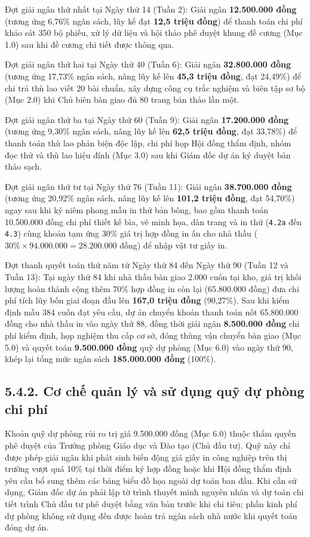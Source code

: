 Đợt giải ngân thứ nhất tại Ngày thứ 14 (Tuần 2): Giải ngân \textbf{12.500.000 đồng} (tương ứng 6,76\% ngân sách, lũy kế đạt \textbf{12,5 triệu đồng}) để thanh toán chi phí khảo sát 350 bộ phiếu, xử lý dữ liệu và hội thảo phê duyệt khung đề cương (Mục 1.0) sau khi đề cương chi tiết được thông qua.

Đợt giải ngân thứ hai tại Ngày thứ 40 (Tuần 6): Giải ngân \textbf{32.800.000 đồng} (tương ứng 17,73\% ngân sách, nâng lũy kế lên \textbf{45,3 triệu đồng}, đạt 24,49\%) để chi trả thù lao viết 20 bài chuẩn, xây dựng công cụ trắc nghiệm và biên tập sơ bộ (Mục 2.0) khi Chủ biên bàn giao đủ 80 trang bản thảo lần một.

Đợt giải ngân thứ ba tại Ngày thứ 60 (Tuần 9): Giải ngân \textbf{17.200.000 đồng} (tương ứng 9,30\% ngân sách, nâng lũy kế lên \textbf{62,5 triệu đồng}, đạt 33,78\%) để thanh toán thù lao phản biện độc lập, chi phí họp Hội đồng thẩm định, nhóm đọc thử và thù lao hiệu đính (Mục 3.0) sau khi Giám đốc dự án ký duyệt bản thảo sạch.

Đợt giải ngân thứ tư tại Ngày thứ 76 (Tuần 11): Giải ngân \textbf{38.700.000 đồng} (tương ứng 20,92\% ngân sách, nâng lũy kế lên \textbf{101,2 triệu đồng}, đạt 54,70\%) ngay sau khi ký niêm phong mẫu in thử bản bông, bao gồm thanh toán 10.500.000 đồng chi phí thiết kế bìa, vẽ minh họa, dàn trang và in thử (\texttt{4.2a} đến \texttt{4.3}) cùng khoản tạm ứng 30\% giá trị hợp đồng in ấn cho nhà thầu ($30\% \times 94.000.000 = 28.200.000$ đồng) để nhập vật tư giấy in.

Đợt thanh quyết toán thứ năm từ Ngày thứ 84 đến Ngày thứ 90 (Tuần 12 và Tuần 13): Tại ngày thứ 84 khi nhà thầu bàn giao 2.000 cuốn tại kho, giá trị khối lượng hoàn thành cộng thêm 70\% hợp đồng in còn lại (65.800.000 đồng) đưa chi phí tích lũy bốn giai đoạn đầu lên \textbf{167,0 triệu đồng} (90,27\%). Sau khi kiểm định mẫu 384 cuốn đạt yêu cầu, dự án chuyển khoản thanh toán nốt 65.800.000 đồng cho nhà thầu in vào ngày thứ 88, đồng thời giải ngân \textbf{8.500.000 đồng} chi phí kiểm định, họp nghiệm thu cấp cơ sở, đóng thùng vận chuyển bàn giao (Mục 5.0) và quyết toán \textbf{9.500.000 đồng} quỹ dự phòng (Mục 6.0) vào ngày thứ 90, khép lại tổng mức ngân sách \textbf{185.000.000 đồng} (100\%).

\subsection{5.4.2. Cơ chế quản lý và sử dụng quỹ dự phòng chi phí}

Khoản quỹ dự phòng rủi ro trị giá 9.500.000 đồng (Mục 6.0) thuộc thẩm quyền phê duyệt của Trưởng phòng Giáo dục và Đào tạo (Chủ đầu tư). Quỹ này chỉ được phép giải ngân khi phát sinh biến động giá giấy in công nghiệp trên thị trường vượt quá 10\% tại thời điểm ký hợp đồng hoặc khi Hội đồng thẩm định yêu cầu bổ sung thêm các bảng biểu đồ họa ngoài dự toán ban đầu. Khi cần sử dụng, Giám đốc dự án phải lập tờ trình thuyết minh nguyên nhân và dự toán chi tiết trình Chủ đầu tư phê duyệt bằng văn bản trước khi chi tiêu; phần kinh phí dự phòng không sử dụng đến được hoàn trả ngân sách nhà nước khi quyết toán đóng dự án.

